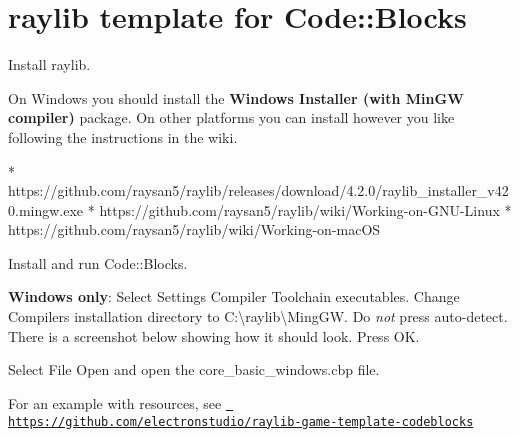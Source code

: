 \chapter{raylib template for Code\+::Blocks}
\hypertarget{md__2home_2giangvu_2CPPprog_2raylib-tetris_2build_2external_2raylib-master_2projects_2CodeBlocks_2README}{}\label{md__2home_2giangvu_2CPPprog_2raylib-tetris_2build_2external_2raylib-master_2projects_2CodeBlocks_2README}
\label{md__2home_2giangvu_2CPPprog_2raylib-tetris_2build_2external_2raylib-master_2projects_2CodeBlocks_2README_autotoc_md76}%
%

\begin{DoxyEnumerate}
\item Install raylib.
\end{DoxyEnumerate}

On Windows you should install the {\bfseries{Windows Installer (with Min\+GW compiler)}} package. On other platforms you can install however you like following the instructions in the wiki. \begin{DoxyVerb}* https://github.com/raysan5/raylib/releases/download/4.2.0/raylib_installer_v420.mingw.exe
* https://github.com/raysan5/raylib/wiki/Working-on-GNU-Linux
* https://github.com/raysan5/raylib/wiki/Working-on-macOS
\end{DoxyVerb}

\begin{DoxyEnumerate}
\item Install and run Code\+::\+Blocks.
\item {\bfseries{Windows only}}\+: Select {\ttfamily Settings} {\ttfamily Compiler} {\ttfamily Toolchain executables}. Change {\ttfamily Compiler\textquotesingle{}s installation directory} to {\ttfamily C\+:\textbackslash{}raylib\textbackslash{}Ming\+GW}. Do {\itshape not} press auto-\/detect. There is a screenshot below showing how it should look. Press {\ttfamily OK}.
\item Select {\ttfamily File} {\ttfamily Open} and open the {\ttfamily core\+\_\+basic\+\_\+windows.\+cbp} file.
\end{DoxyEnumerate}



For an example with resources, see \href{https://github.com/electronstudio/raylib-game-template-codeblocks}{\texttt{ https\+://github.\+com/electronstudio/raylib-\/game-\/template-\/codeblocks}} 